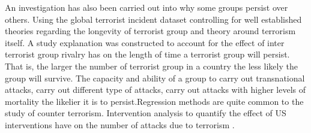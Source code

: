 An investigation has also been carried out into why some groups persist over others. Using the global terrorist incident dataset controlling for well established theories regarding the longevity of terrorist group and theory around terrorism itself. A study explanation was constructed to account for the effect of inter terrorist group rivalry has on the length of time a terrorist group will persist. That is, the larger the number of terrorist group in a country the less likely the group will survive. The capacity and ability of a group to carry out transnational attacks, carry out different type of attacks, carry out attacks with higher levels of mortality the likelier it is to persist.Regression methods are quite common to the study of counter terrorism. Intervention analysis to quantify the effect of US interventions have on the number of attacks due to terrorism \citep{enders1993effectiveness}.


